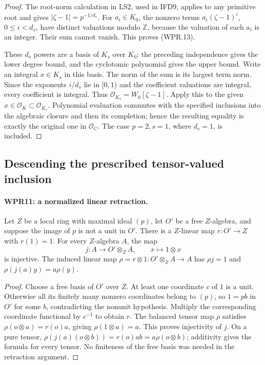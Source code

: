 \begin{proof}
The root-norm calculation in LS2, used in IFD9, applies to any
primitive root and gives $|\zeta-1|=p^{-1/d_s}$. For
$a_i\in K_0$, the nonzero terms $a_i(\zeta-1)^i$,
$0\leq i<d_s$, have distinct valuations modulo $\mathbb Z$,
because the valuation of each $a_i$ is an integer. Their sum
cannot vanish. This proves (WPR.13).

These $d_s$ powers are a basis of $K_s$ over $K_0$: the preceding
independence gives the lower degree bound, and the cyclotomic
polynomial gives the upper bound. Write an integral $x\in K_s$
in this basis. The norm of the sum is its largest term norm.
Since the exponents $i/d_s$ lie in $[0,1)$ and the coefficient
valuations are integral, every coefficient is integral.
Thus $\mathcal O_{K_s}=W_0[\zeta-1]$. Apply this to the given
$x\in\mathcal O_K\subset\mathcal O_{K_s}$. Polynomial evaluation
commutes with the specified inclusions into the algebraic closure
and then its completion; hence the resulting equality is exactly
the original one in $\mathcal O_C$. The case $p=2,s=1$, where
$d_s=1$, is included.
\end{proof}

\subsection{Descending the prescribed tensor-valued inclusion}

\paragraph{WPR11: a normalized linear retraction.}
\label{claim:WPR11}
Let $Z$ be a local ring with maximal ideal $(p)$, let $O'$ be
a free $Z$-algebra, and suppose the image of $p$ is not a unit
in $O'$. There is a $Z$-linear map $r:O'\to Z$ with $r(1)=1$.
For every $Z$-algebra $A$, the map
\[
 j:A\longrightarrow O'\otimes_Z A,\qquad x\longmapsto1\otimes x
 \tag{WPR.14}
\]
is injective. The induced linear map
$\rho=r\otimes1:O'\otimes_Z A\to A$ has
$\rho j=1$ and $\rho(j(a)y)=a\rho(y)$.

\begin{proof}
Choose a free basis of $O'$ over $Z$. At least one coordinate
$c$ of $1$ is a unit. Otherwise all its finitely many nonzero
coordinates belong to $(p)$, so $1=pb$ in $O'$ for some $b$,
contradicting the nonunit hypothesis. Multiply the corresponding
coordinate functional by $c^{-1}$ to obtain $r$.
The balanced tensor map $\rho$ satisfies
$\rho(o\otimes a)=r(o)a$, giving $\rho(1\otimes a)=a$.
This proves injectivity of $j$. On a pure tensor,
$\rho(j(a)(o\otimes b))=r(o)ab=a\rho(o\otimes b)$;
additivity gives the formula for every tensor. No finiteness
of the free basis was needed in the retraction argument.
\end{proof}

